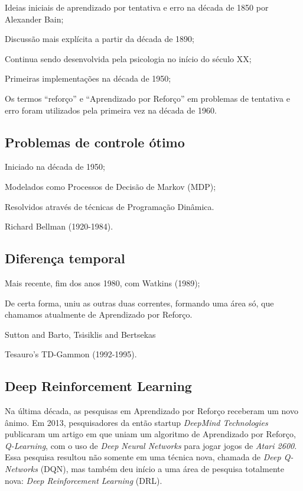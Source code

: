\documentclass{article}
\begin{document}
            Ideias iniciais de aprendizado por tentativa e erro na década de 1850 por Alexander Bain;
            
            Discussão mais explícita a partir da década de 1890;
            
            Continua sendo desenvolvida pela psicologia no início do século XX;
            
            Primeiras implementações na década de 1950;
            
            Os termos “reforço” e “Aprendizado por Reforço” em problemas de tentativa e erro foram utilizados pela primeira vez na década de 1960.
        
        \subsection{Problemas de controle ótimo}
        
            Iniciado na década de 1950;
            
            Modelados como Processos de Decisão de Markov (MDP);
            
            Resolvidos através de técnicas de Programação Dinâmica.
            
            Richard Bellman (1920-1984).
            
        \subsection{Diferença temporal}
        
            Mais recente, fim dos anos 1980, com Watkins (1989);
            
            De certa forma, uniu as outras duas correntes, formando uma área só, que chamamos atualmente de Aprendizado por Reforço.
            
            Sutton and Barto, Tsisiklis and Bertsekas
            
            Tesauro's TD-Gammon (1992-1995).
        
        \subsection{Deep Reinforcement Learning}
        
            Na última década, as pesquisas em Aprendizado por Reforço receberam um novo ânimo. Em 2013, pesquisadores da então startup \emph{DeepMind Technologies} publicaram um artigo em que uniam um algoritmo de Aprendizado por Reforço, \emph{Q-Learning}, com o uso de \emph{Deep Neural Networks} para jogar jogos de \emph{Atari 2600}. Essa pesquisa resultou não somente em uma técnica nova, chamada de \emph{Deep Q-Networks} (DQN), mas também deu início a uma área de pesquisa totalmente nova: \emph{Deep Reinforcement Learning} (DRL). 
            
\end{document}
